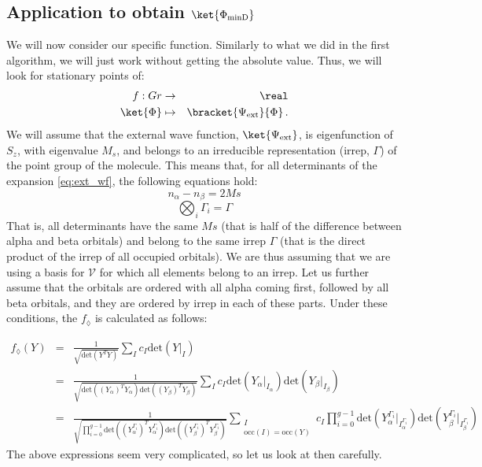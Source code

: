\documentclass[a4paper,11pt]{article}
\begin{document}
\subsection{Application to obtain $\ket{\Phi_\text{minD}}$}

We will now consider our specific function.
Similarly to what we did in the first algorithm, we will just work without getting the absolute value.
Thus, we will look for stationary points of:
\begin{eqnarray}
  f : Gr &\to& \real\\
  \ket{\Phi} &\mapsto& \bracket{\Psi_\text{ext}}{\Phi}\,.
\end{eqnarray}
We will assume that the external wave function, $\ket{\Psi_\text{ext}}$, is eigenfunction of $S_z$, with eigenvalue $M_s$, and belongs to an irreducible representation (irrep, $\Gamma$) of the point group of the molecule.
This means that, for all determinants of the expansion \ref{eq:ext_wf}, the following equations hold:
\begin{equation}
  n_\alpha - n_\beta = 2 Ms
\end{equation}
\begin{equation}\label{eq:irrep_condition}
  \bigotimes_i \Gamma_i = \Gamma
\end{equation}
That is, all determinants have the same $Ms$ (that is half of the difference between alpha and beta orbitals) and belong to the same irrep $\Gamma$ (that is the direct product of the irrep of all occupied orbitals).
We are thus assuming that we are using a basis for $\mathcal{V}$ for which all elements belong to an irrep.
Let us further assume that the orbitals are ordered with all alpha coming first, followed by all beta orbitals, and they are ordered by irrep in each of these parts.
Under these conditions, the $f_\lozenge$ is calculated as follows:

\begin{eqnarray}
  f_\lozenge(Y)
  &=& \frac{1}{\sqrt{\text{det} \left( Y^T Y \right)}}
      \sum_{I} c_I \text{det} \left( Y\big|_I \right)\\
  &=& \frac{1}{\sqrt{
      \text{det} \left( (Y_\alpha)^T Y_\alpha \right)
      \text{det} \left( (Y_\beta)^T Y_\beta \right)
      }}
      \sum_{I} c_I
      \text{det} \left( Y_\alpha\big|_{I_\alpha} \right)
      \text{det} \left( Y_\beta\big|_{I_\beta} \right)\\\label{eq:f_diam_spin_irrep}
  &=& \frac{1}{\sqrt{
      \prod_{i=0}^{g-1}
      \text{det} \left( (Y_\alpha^{\Gamma_i})^T Y_\alpha^{\Gamma_i} \right)
      \text{det} \left( (Y_\beta^{\Gamma_i})^T Y_\beta^{\Gamma_i} \right)
      }}
      \sum_{\substack{I\\\text{occ}(I) = \text{occ}(Y)}} c_I
  \prod_{i=0}^{g-1}
  \text{det} \left( Y_\alpha^{\Gamma_i}\big|_{I_\alpha^{\Gamma_i}} \right)
  \text{det} \left( Y_\beta^{\Gamma_i}\big|_{I_\beta^{\Gamma_i}} \right)
\end{eqnarray}
The above expressions seem very complicated, so let us look at then carefully.
\end{document}

